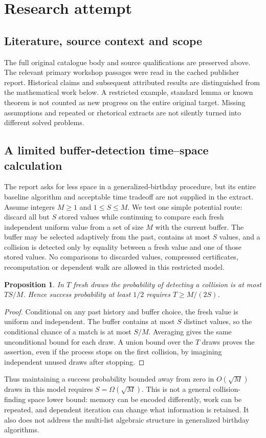 \documentclass[11pt]{article}
\newtheorem{proposition}{Proposition}
\begin{document}
\section{Research attempt}
\subsection{Literature, source context and scope}
The full original catalogue body and source qualifications are preserved above. The relevant primary workshop passages were read in the cached publisher report. Historical claims and subsequent attributed results are distinguished from the mathematical work below. A restricted example, standard lemma or known theorem is not counted as new progress on the entire original target. Missing assumptions and repeated or rhetorical extracts are not silently turned into different solved problems.

\subsection{A limited buffer-detection time--space calculation}
The report asks for less space in a generalized-birthday procedure, but its entire baseline algorithm and acceptable time tradeoff are not supplied in the extract. Assume integers $M\ge1$ and $1\le S\le M$. We test one simple potential route: discard all but $S$ stored values while continuing to compare each fresh independent uniform value from a set of size $M$ with the current buffer. The buffer may be selected adaptively from the past, contains at most $S$ values, and a collision is detected only by equality between a fresh value and one of those stored values. No comparisons to discarded values, compressed certificates, recomputation or dependent walk are allowed in this restricted model.
\begin{proposition}
In $T$ fresh draws the probability of detecting a collision is at most $TS/M$. Hence success probability at least $1/2$ requires $T\ge M/(2S)$.
\end{proposition}
\begin{proof}
Conditional on any past history and buffer choice, the fresh value is uniform and independent. The buffer contains at most $S$ distinct values, so the conditional chance of a match is at most $S/M$. Averaging gives the same unconditional bound for each draw. A union bound over the $T$ draws proves the assertion, even if the process stops on the first collision, by imagining independent unused draws after stopping.
\end{proof}
Thus maintaining a success probability bounded away from zero in $O(\sqrt M)$ draws in this model requires $S=\Omega(\sqrt M)$. This is not a general collision-finding space lower bound: memory can be encoded differently, work can be repeated, and dependent iteration can change what information is retained. It also does not address the multi-list algebraic structure in generalized birthday algorithms.
\end{document}
